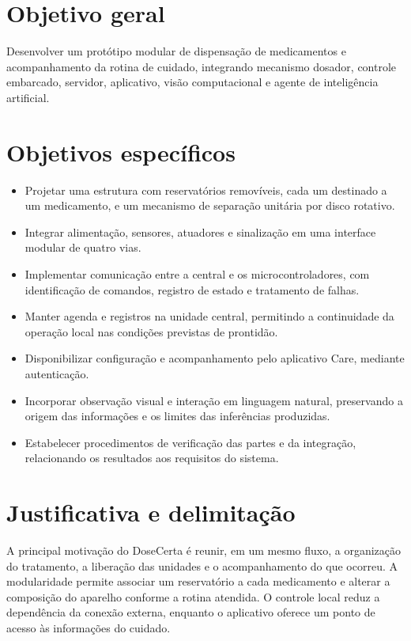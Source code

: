 \section{Objetivo geral}
Desenvolver um protótipo modular de dispensação de medicamentos e acompanhamento da rotina de cuidado, integrando mecanismo dosador, controle embarcado, servidor, aplicativo, visão computacional e agente de inteligência artificial.

\section{Objetivos específicos}
\begin{itemize}
\item Projetar uma estrutura com reservatórios removíveis, cada um destinado a um medicamento, e um mecanismo de separação unitária por disco rotativo.
\item Integrar alimentação, sensores, atuadores e sinalização em uma interface modular de quatro vias.
\item Implementar comunicação entre a central e os microcontroladores, com identificação de comandos, registro de estado e tratamento de falhas.
\item Manter agenda e registros na unidade central, permitindo a continuidade da operação local nas condições previstas de prontidão.
\item Disponibilizar configuração e acompanhamento pelo aplicativo Care, mediante autenticação.
\item Incorporar observação visual e interação em linguagem natural, preservando a origem das informações e os limites das inferências produzidas.
\item Estabelecer procedimentos de verificação das partes e da integração, relacionando os resultados aos requisitos do sistema.
\end{itemize}

\section{Justificativa e delimitação}
A principal motivação do DoseCerta é reunir, em um mesmo fluxo, a organização do tratamento, a liberação das unidades e o acompanhamento do que ocorreu. A modularidade permite associar um reservatório a cada medicamento e alterar a composição do aparelho conforme a rotina atendida. O controle local reduz a dependência da conexão externa, enquanto o aplicativo oferece um ponto de acesso às informações do cuidado.

